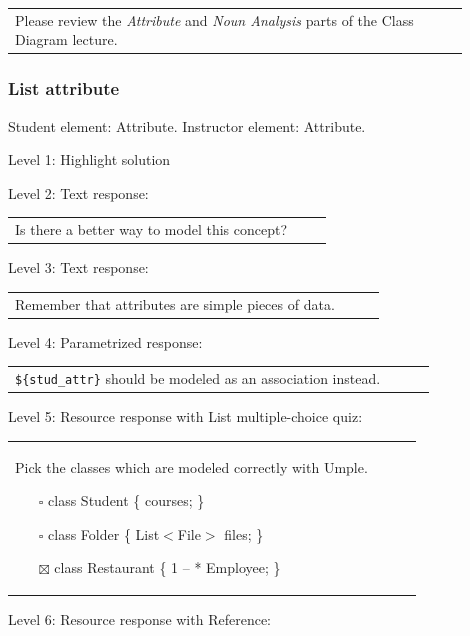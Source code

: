 \begin{tabular}{|p{0.9\linewidth}}
Please review the \textit{Attribute} and \textit{Noun Analysis} parts of the Class Diagram lecture.
\end{tabular} \medskip


\subsubsection{List attribute}

Student element: Attribute. Instructor element: Attribute. \medskip

\noindent Level 1: Highlight solution  \medskip

\noindent Level 2: Text response: \medskip

\begin{tabular}{|p{0.9\linewidth}}
Is there a better way to model this concept?
\end{tabular} \medskip

\noindent Level 3: Text response: \medskip

\begin{tabular}{|p{0.9\linewidth}}
Remember that attributes are simple pieces of data.
\end{tabular} \medskip

\noindent Level 4: Parametrized response: \medskip

\begin{tabular}{|p{0.9\linewidth}}
\verb|${stud_attr}| should be modeled as an association instead.
\end{tabular} \medskip

\noindent Level 5: Resource response with List multiple-choice quiz: \medskip

\begin{tabular}{|p{0.9\linewidth}}

Pick the classes which are modeled correctly with Umple.

\begin{itemize}
    \item[$\square$] class Student \{ courses; \}
    \item[$\square$] class Folder \{ List$<$File$>$ files; \}
    \item[$\boxtimes$] class Restaurant \{ 1 -- * Employee; \}
\end{itemize}

\end{tabular} \medskip

\noindent Level 6: Resource response with Reference: \medskip

